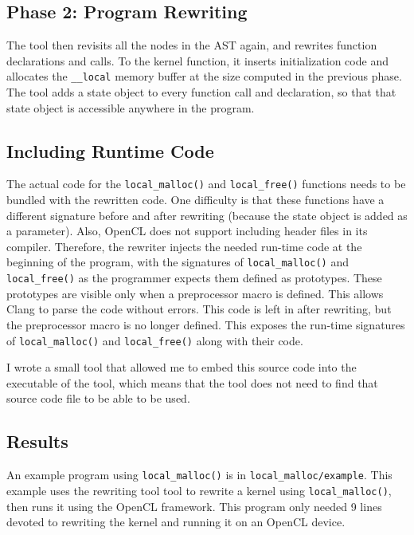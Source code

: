 \documentclass{article}
\begin{document}
\subsection{Phase 2: Program Rewriting}
The tool then revisits all the nodes in the AST again, and rewrites function declarations and calls. To the kernel function, it inserts initialization code and allocates the \texttt{\_\_local} memory buffer at the size computed in the previous phase. The tool adds a state object to every function call and declaration, so that that state object is accessible anywhere in the program.

\subsection{Including Runtime Code}
The actual code for the \texttt{local\_malloc()} and \texttt{local\_free()} functions needs to be bundled with the rewritten code. One difficulty is that these functions have a different signature before and after rewriting (because the state object is added as a parameter). Also, OpenCL does not support including header files in its compiler. Therefore, the rewriter injects the needed run-time code at the beginning of the program, with the signatures of \texttt{local\_malloc()} and \texttt{local\_free()} as the programmer expects them defined as prototypes. These prototypes are visible only when a preprocessor macro is defined. This allows Clang to parse the code without errors. This code is left in after rewriting, but the preprocessor macro is no longer defined. This exposes the run-time signatures of \texttt{local\_malloc()} and \texttt{local\_free()} along with their code.

I wrote a small tool that allowed me to embed this source code into the executable of the tool, which means that the tool does not need to find that source code file to be able to be used.

\subsection{Results}
An example program using \texttt{local\_malloc()} is in \texttt{local\_malloc/example}. This example uses the rewriting tool tool to rewrite a kernel using \texttt{local\_malloc()}, then runs it using the OpenCL framework. This program only needed 9 lines devoted to rewriting the kernel and running it on an OpenCL device.

\end{document}
